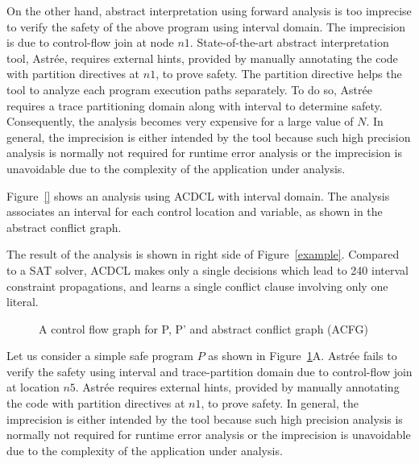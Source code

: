 On the other hand, abstract interpretation using forward analysis 
is too imprecise to verify the safety of the above program using 
interval domain.  The imprecision is due to control-flow join at 
node $n1$.  State-of-the-art abstract interpretation tool, Astr{\'e}e, 
requires external hints, provided by manually annotating the code 
with partition directives at $n1$, to prove safety.  The partition 
directive helps the tool to analyze each program execution paths separately.  
To do so, Astr{\'e}e requires a trace partitioning domain along with interval 
to determine safety.  Consequently, the analysis becomes very expensive 
for a large value of $N$.  In general, the imprecision is either intended 
  by the tool because such high precision analysis is normally not required for runtime error analysis or the imprecision is unavoidable due to the complexity 
of the application under analysis.  


Figure~\ref{} shows an analysis using ACDCL with interval domain.  The 
analysis associates an interval for each control location and variable, 
as shown in the abstract conflict graph.   

The result of the analysis is shown in right side of Figure~\ref{example}.  
Compared to a SAT solver, ACDCL makes only a single decisions which lead 
to 240 interval constraint propagations, and learns a single conflict clause 
involving only one literal.     



\begin{figure}[htp]
\centering
\vspace*{0.3cm}
\caption{A control flow graph for P, P' and abstract conflict graph (ACFG) \label{fig:filter}}
\end{figure}

Let us consider a simple safe program $P$ as shown in Figure~\ref{fig:filter}A.
Astr{\'e}e fails to verify the safety using interval and trace-partition domain
due to control-flow join at location $n5$.  Astr{\'e}e requires external hints, provided by 
manually annotating the code with partition directives at $n1$, to prove safety.  
In general, the imprecision is either intended by the tool because such high precision analysis is 
normally not required for runtime error analysis or the imprecision is unavoidable 
due to the complexity of the application under analysis.

